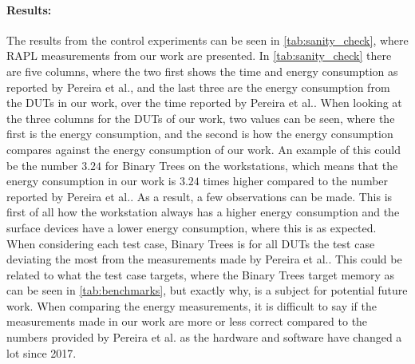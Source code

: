 \paragraph*{Results:} The results from the control experiments can be seen in \cref{tab:sanity_check}, where RAPL measurements from our work are presented. In \cref{tab:sanity_check} there are five columns, where the two first shows the time and energy consumption as reported by Pereira et al.\cite[]{Pereira2017}, and the last three are the energy consumption from the DUTs in our work, over the time reported by Pereira et al.\cite[]{Pereira2017}. When looking at the three columns for the DUTs of our work, two values can be seen, where the first is the energy consumption, and the second is how the energy consumption compares against the energy consumption of our work. An example of this could be the number $3.24$ for Binary Trees on the workstations, which means that the energy consumption in our work is $3.24$ times higher compared to the number reported by Pereira et al.\cite[]{Pereira2017}. As a result, a few observations can be made. This is first of all how the workstation always has a higher energy consumption and the surface devices have a lower energy consumption, where this is as expected. When considering each test case, Binary Trees is for all DUTs the test case deviating the most from the measurements made by Pereira et al.\cite[]{Pereira2017}. This could be related to what the test case targets, where the Binary Trees target memory as can be seen in \cref{tab:benchmarks}, but exactly why, is a subject for potential future work. When comparing the energy measurements, it is difficult to say if the measurements made in our work are more or less correct compared to the numbers provided by Pereira et al.\cite[]{Pereira2017} as the hardware and software have changed a lot since 2017.